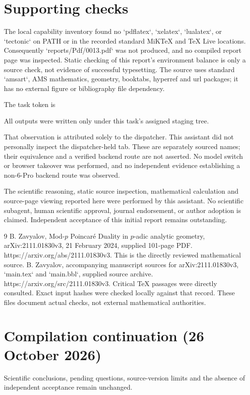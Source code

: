 \documentclass[10pt]{article}
\begin{document}
\section*{Supporting checks}
The local capability inventory found no `pdflatex`, `xelatex`, `lualatex`, or `tectonic` on PATH or in the recorded standard MiKTeX and TeX Live locations. Consequently `reports/Pdf/0013.pdf` was not produced, and no compiled report page was inspected. Static checking of this report’s environment balance is only a source check, not evidence of successful typesetting. The source uses standard `amsart`, AMS mathematics, geometry, booktabs, hyperref and url packages; it has no external figure or bibliography file dependency.\par
The task token is\par
All outputs were written only under this task’s assigned staging tree.\par
That observation is attributed solely to the dispatcher. This assistant did not personally inspect the dispatcher-held tab. These are separately sourced names; their equivalence and a verified backend route are not asserted. No model switch or browser takeover was performed, and no independent evidence establishing a non-6-Pro backend route was observed.\par
The scientific reasoning, static source inspection, mathematical calculation and source-page viewing reported here were performed by this assistant. No scientific subagent, human scientific approval, journal endorsement, or author adoption is claimed. Independent acceptance of this initial report remains outstanding.\par
9 B. Zavyalov, Mod-\(p\) Poincaré Duality in \(p\)-adic analytic geometry, arXiv:2111.01830v3, 21 February 2024, supplied 101-page PDF. https://arxiv.org/abs/2111.01830v3. This is the directly reviewed mathematical source. B. Zavyalov, accompanying manuscript sources for arXiv:2111.01830v3, `main.tex` and `main.bbl`, supplied source archive. https://arxiv.org/src/2111.01830v3. Critical TeX passages were directly consulted. Exact input hashes were checked locally against that record. These files document actual checks, not external mathematical authorities.\par
\section*{Compilation continuation (26 October 2026)}
Scientific conclusions, pending questions, source-version limits and the absence of independent acceptance remain unchanged.\par
\end{document}
